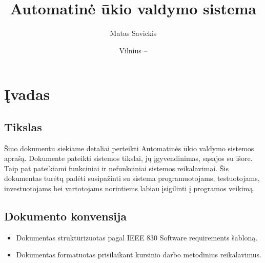 \documentclass[oneside]{VUMIFPSkursinis}
\title{Automatinė ūkio valdymo sistema}
\author{Matas Savickis}
\date{Vilnius – \the\year}
\begin{document}
\maketitle


\centering

 
\tableofcontents


\section{Įvadas}
\subsection{Tikslas}
Šiuo dokumentu siekiame detaliai perteikti Automatinės ūkio valdymo sistemos aprašą. Dokumente pateikti sistemos tikslai, jų įgyvendinimas, sąsajos su išore. Taip pat pateikiami funkciniai ir nefunkciniai sistemos reikalavimai. Šis dokumentas turėtų padėti susipažinti su sistema programuotojams, testuotojams, investuotojams bei vartotojams norintiems labiau įsigilinti į programos veikimą.
\subsection{Dokumento konvensija}
\begin{itemize}
	\item Dokumentas struktūrizuotas pagal IEEE 830 Software requirements šabloną.
	\item Dokumentas formatuotas prisilaikant kursinio darbo metodinius reikalavimus.
\end{itemize}
\end{document}

